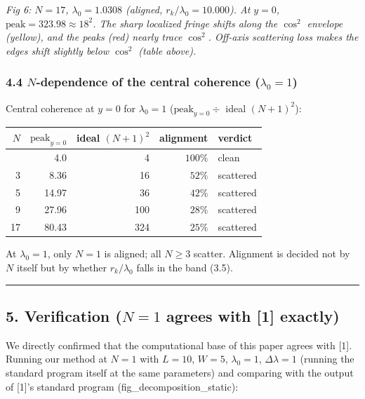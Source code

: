 \documentclass[
]{article}
\newcounter{none} %
\begin{document}
\emph{Fig 6: \(N=17\), \(\lambda_0=1.0308\) (aligned,
\(r_k/\lambda_0=10.000\)). At \(y=0\),
\(\mathrm{peak}=323.98\approx18^2\). The sharp localized fringe shifts
along the \(\cos^2\) envelope (yellow), and the peaks (red) nearly trace
\(\cos^2\). Off-axis scattering loss makes the edges shift slightly
below \(\cos^2\) (table above).}

\subsubsection{\texorpdfstring{4.4 \(N\)-dependence of the central
coherence
(\(\lambda_0=1\))}{4.4 N-dependence of the central coherence (\textbackslash lambda\_0=1)}}\label{n-dependence-of-the-central-coherence-lambda_01}

Central coherence at \(y=0\) for \(\lambda_0=1\)
(\(\mathrm{peak}_{y=0}\div\) ideal \((N+1)^2\)):

{\def\LTcaptype{none} %
\begin{longtable}[]{@{}rrrrl@{}}
\toprule\noalign{}
\(N\) & \(\mathrm{peak}_{y=0}\) & ideal \((N+1)^2\) & alignment &
verdict \\
\midrule\noalign{}
\endhead
\bottomrule\noalign{}
\endlastfoot
1 & 4.0 & 4 & \(100\%\) & clean \\
3 & 8.36 & 16 & \(52\%\) & scattered \\
5 & 14.97 & 36 & \(42\%\) & scattered \\
9 & 27.96 & 100 & \(28\%\) & scattered \\
17 & 80.43 & 324 & \(25\%\) & scattered \\
\end{longtable}
}

At \(\lambda_0=1\), only \(N=1\) is aligned; all \(N\ge3\) scatter.
Alignment is decided not by \(N\) itself but by whether
\(r_k/\lambda_0\) falls in the band (3.5).

\begin{center}\rule{0.5\linewidth}{0.5pt}\end{center}

\subsection{\texorpdfstring{5. Verification (\(N=1\) agrees with {[}1{]}
exactly)}{5. Verification (N=1 agrees with {[}1{]} exactly)}}\label{verification-n1-agrees-with-1-exactly}

We directly confirmed that the computational base of this paper agrees
with {[}1{]}. Running our method at \(N=1\) with \(L=10\), \(W=5\),
\(\lambda_0=1\), \(\Delta\lambda=1\) (running the standard program
itself at the same parameters) and comparing with the output of
{[}1{]}'s standard program (fig\_decomposition\_static):
\end{document}

